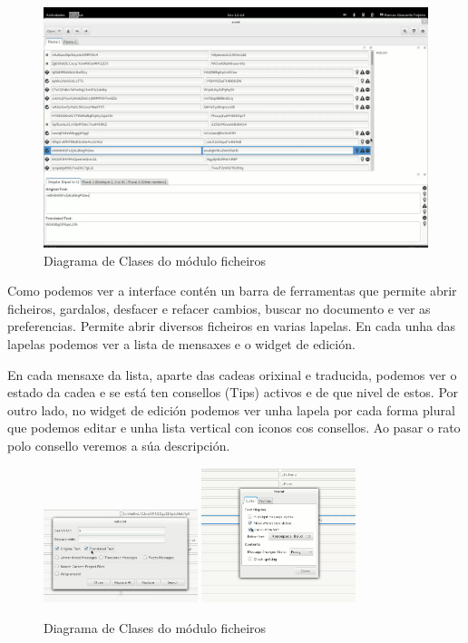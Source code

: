 \begin{figure}[h!]
  \centering
    \includegraphics[width=\textwidth]{img/gsoc1_it2_ui.png}
    \caption{Diagrama de Clases do módulo ficheiros}
    \label{fig:ui:v1:general}
\end{figure}

Como podemos ver a interface contén un barra de ferramentas que permite abrir ficheiros, gardalos, desfacer e refacer cambios, buscar no documento e ver as preferencias. Permite abrir diversos ficheiros en varias lapelas. En cada unha das lapelas podemos ver a lista de mensaxes e o widget de edición.

En cada mensaxe da lista, aparte das cadeas orixinal e traducida, podemos ver o estado da cadea e se está ten consellos (Tips) activos e de que nivel de estos. Por outro lado, no widget de edición podemos ver unha lapela por cada forma plural que podemos editar e unha lista vertical con iconos cos consellos. Ao pasar o rato polo consello veremos a súa descripción.

\begin{figure}[h!]
  \centering
  \includegraphics[width=0.4\textwidth]{img/gsoc1_it3_ui.png}
  \includegraphics[width=0.4\textwidth]{img/gsoc1_it5_prefs.png}
  \caption{Diagrama de Clases do módulo ficheiros}
  \label{fig:ui:v1:dialogs}
\end{figure}

